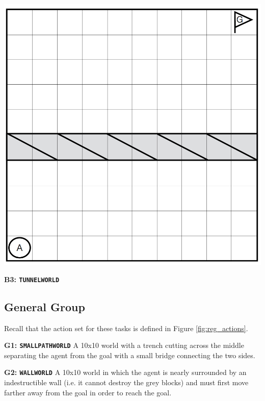 \documentclass[]{article}
\begin{document}
\begin{center}
\includegraphics[scale=0.28]{figures/bridgeworld10.png}
\end{center}

{\bf B3: \texttt{TUNNELWORLD}}



\subsection{General Group}

Recall that the action set for these tasks is defined in Figure \ref{fig:reg_actions}.

{\bf G1: \texttt{SMALLPATHWORLD}} A 10x10 world with a trench cutting across the middle separating the agent from the goal with a small bridge connecting the two sides.


{\bf G2: \texttt{WALLWORLD}} A 10x10 world in which the agent is nearly surrounded by an indestructible wall (i.e. it cannot destroy the grey blocks) and must first move farther away from the goal in order to reach the goal.
\end{document}
